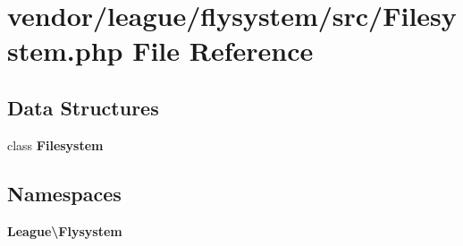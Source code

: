 \section{vendor/league/flysystem/src/\+Filesystem.php File Reference}
\label{league_2flysystem_2src_2_filesystem_8php}
\subsection*{Data Structures}
\begin{DoxyCompactItemize}
\item 
class {\bf Filesystem}
\end{DoxyCompactItemize}
\subsection*{Namespaces}
\begin{DoxyCompactItemize}
\item 
 {\bf League\textbackslash{}\+Flysystem}
\end{DoxyCompactItemize}
